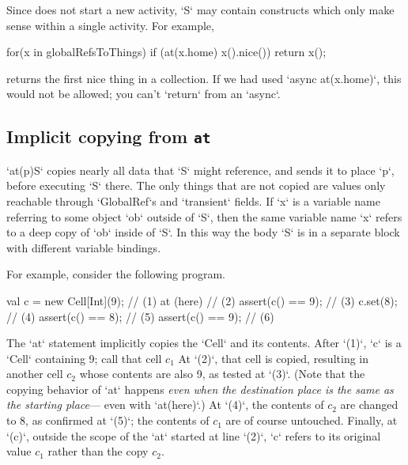 Since  does not start a new activity, 
\xcd`S` may contain constructs which only make sense
within a single activity.  
For example, 
\begin{xten}
    for(x in globalRefsToThings) 
      if (at(x.home) x().nice()) 
        return x();
\end{xten}
returns the first nice thing in a collection.   If we had used 
\xcd`async at(x.home)`, this would not be allowed; 
you can't \xcd`return` from an
\xcd`async`. 

\subsection{Implicit copying from {\tt at} }

\xcd`at(p)S` copies nearly all data that \xcd`S` might reference, and sends it
to place \xcd`p`, before executing \xcd`S` there. The only things that are not
copied are values only reachable through \xcd`GlobalRef`s and \xcd`transient`
fields.    If \xcd`x` is a
variable name referring to some object \xcd`ob` outside of \xcd`S`, then the
same variable name \xcd`x` refers to a deep copy of \xcd`ob`
inside of \xcd`S`.  In this way the body \xcd`S` is in a separate block with
different variable bindings.

For example, consider the following program.
\begin{xten}
val c = new Cell[Int](9); // (1)
at (here) {               // (2)
   assert(c() == 9);      // (3)
   c.set(8);              // (4)
   assert(c() == 8);      // (5)
}
assert(c() == 9);         // (6)
\end{xten}
The \xcd`at` statement implicitly copies the \xcd`Cell` and its contents.  
After \xcd`(1)`, \xcd`c` is a \xcd`Cell` containing 9; call that cell {$c_1$}
At \xcd`(2)`, that cell is copied, resulting in another cell {$c_2$} whose
contents are also 9, as tested at \xcd`(3)`.
(Note that the copying behavior of \xcd`at` happens {\em even when the
destination place is the same as the starting place}--- even with
\xcd`at(here)`.)
At \xcd`(4)`, the contents of {$c_2$} are changed to 8, as confirmed at \xcd`(5)`; the contents of
{$c_1$} are of course untouched.    Finally, at \xcd`(c)`, outside the scope
of the \xcd`at` started at line \xcd`(2)`, \xcd`c` refers to its original
value {$c_1$} rather than the copy {$c_2$}.  

